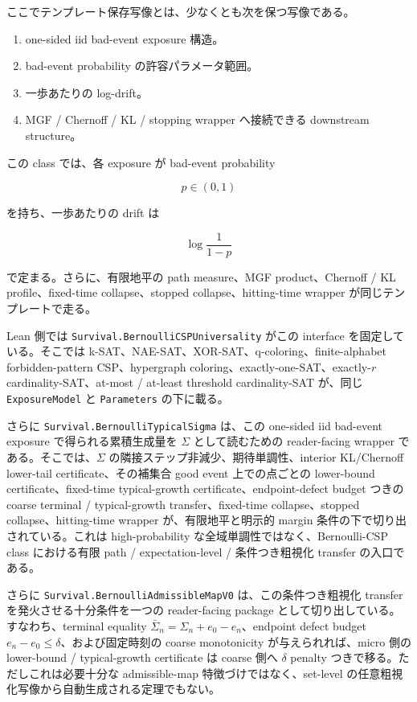 \documentclass[12pt,a4paper]{article}
\begin{document}
ここでテンプレート保存写像とは、少なくとも次を保つ写像である。

\begin{enumerate}
\def\labelenumi{\arabic{enumi}.}
\tightlist
\item
  one-sided iid bad-event exposure 構造。
\item
  bad-event probability の許容パラメータ範囲。
\item
  一歩あたりの log-drift。
\item
  MGF / Chernoff / KL / stopping wrapper へ接続できる downstream structure。
\end{enumerate}

この class では、各 exposure が bad-event probability

\[
p\in(0,1)
\]

を持ち、一歩あたりの drift は

\[
\log\frac{1}{1-p}
\]

で定まる。さらに、有限地平の path measure、MGF product、Chernoff / KL profile、fixed-time collapse、stopped collapse、hitting-time wrapper が同じテンプレートで走る。

Lean 側では \texttt{Survival.BernoulliCSPUniversality} がこの interface を固定している。そこでは k-SAT、NAE-SAT、XOR-SAT、q-coloring、finite-alphabet forbidden-pattern CSP、hypergraph coloring、exactly-one-SAT、exactly-\(r\) cardinality-SAT、at-most / at-least threshold cardinality-SAT が、同じ \texttt{ExposureModel} と \texttt{Parameters} の下に載る。

さらに \texttt{Survival.BernoulliTypicalSigma} は、この one-sided iid bad-event exposure で得られる累積生成量を \(\Sigma\) として読むための reader-facing wrapper である。そこでは、\(\Sigma\) の隣接ステップ非減少、期待単調性、interior KL/Chernoff lower-tail certificate、その補集合 good event 上での点ごとの lower-bound certificate、fixed-time typical-growth certificate、endpoint-defect budget つきの coarse terminal / typical-growth transfer、fixed-time collapse、stopped collapse、hitting-time wrapper が、有限地平と明示的 margin 条件の下で切り出されている。これは high-probability な全域単調性ではなく、Bernoulli-CSP class における有限 path / expectation-level / 条件つき粗視化 transfer の入口である。

さらに \texttt{Survival.BernoulliAdmissibleMapV0} は、この条件つき粗視化 transfer を発火させる十分条件を一つの reader-facing package として切り出している。すなわち、terminal equality \(\bar\Sigma_{n}=\Sigma_{n}+e_0-e_{n}\)、endpoint defect budget \(e_{n}-e_0\le\delta\)、および固定時刻の coarse monotonicity が与えられれば、micro 側の lower-bound / typical-growth certificate は coarse 側へ \(\delta\) penalty つきで移る。ただしこれは必要十分な admissible-map 特徴づけではなく、set-level の任意粗視化写像から自動生成される定理でもない。
\end{document}
